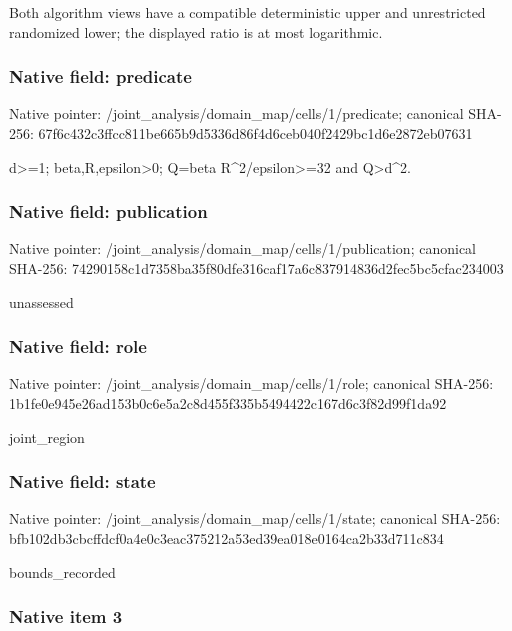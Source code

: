 \documentclass[10pt,a4paper]{article}
\begin{document}
Both algorithm views have a compatible deterministic upper and unrestricted randomized lower; the displayed ratio is at most logarithmic.


\subsubsection{Native field: predicate}


Native pointer: /joint\_analysis/domain\_m\allowbreak{}ap/cells/1/predicate; canonical SHA-256: 67f6c432c3ffcc811be665b9\allowbreak{}d5336d86f4d6ceb040f2429b\allowbreak{}c1d6e2872eb07631


d>=1; beta,R,epsilon>0; Q=beta R\textasciicircum{}2/epsilon>=32 and Q>d\textasciicircum{}2.


\subsubsection{Native field: publication}


Native pointer: /joint\_analysis/domain\_m\allowbreak{}ap/cells/1/publication; canonical SHA-256: 74290158c1d7358ba35f80df\allowbreak{}e316caf17a6c837914836d2f\allowbreak{}ec5bc5cfac234003


unassessed


\subsubsection{Native field: role}


Native pointer: /joint\_analysis/domain\_map/cells/1/role; canonical SHA-256: 1b1fe0e945e26ad153b0c6e5\allowbreak{}a2c8d455f335b5494422c167\allowbreak{}d6c3f82d99f1da92


joint\_region


\subsubsection{Native field: state}


Native pointer: /joint\_analysis/domain\_m\allowbreak{}ap/cells/1/state; canonical SHA-256: bfb102db3cbcffdcf0a4e0c3\allowbreak{}eac375212a53ed39ea018e01\allowbreak{}64ca2b33d711c834


bounds\_recorded


\subsubsection{Native item 3}
\end{document}
